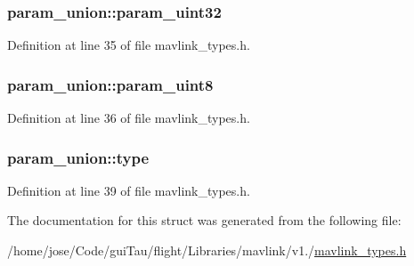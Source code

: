 \hypertarget{structparam__union_a67c8edafdce53186bd16154cdbe1d736}{
\subsubsection[{param\-\_\-uint32}]{ param\-\_\-union\-::param\-\_\-uint32}}\label{structparam__union_a67c8edafdce53186bd16154cdbe1d736}


Definition at line 35 of file mavlink\-\_\-types.\-h.

\hypertarget{structparam__union_ad3e573e92099cb9f0cfabf556a6c99a7}{
\subsubsection[{param\-\_\-uint8}]{ param\-\_\-union\-::param\-\_\-uint8}}\label{structparam__union_ad3e573e92099cb9f0cfabf556a6c99a7}


Definition at line 36 of file mavlink\-\_\-types.\-h.

\hypertarget{structparam__union_a931bfe7edb069e632613635165968af6}{
\subsubsection[{type}]{ param\-\_\-union\-::type}}\label{structparam__union_a931bfe7edb069e632613635165968af6}


Definition at line 39 of file mavlink\-\_\-types.\-h.



The documentation for this struct was generated from the following file\-:\begin{DoxyCompactItemize}
\item 
/home/jose/\-Code/gui\-Tau/flight/\-Libraries/mavlink/v1./\hyperlink{mavlink__types_8h}{mavlink\-\_\-types.\-h}\end{DoxyCompactItemize}
